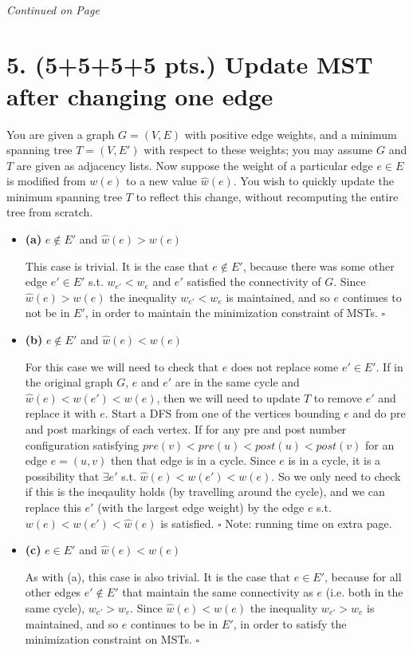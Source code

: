 \documentclass[11pt]{article}
\begin{document}
%
\paragraph{} \emph{Continued on Page \pageref{pg:p4-continuation}}


\newpage

\section*{5. (5+5+5+5 pts.) Update MST after changing one edge}

You are given a graph $G = (V,E)$ with positive edge weights, and a minimum spanning tree $T = (V, E')$ with respect to these weights; you may assume $G$ and $T$ are given as adjacency lists. Now suppose the weight of a particular edge $e \in E$ is modified from $w(e)$ to a new value $\hat{w}(e)$. You wish to quickly update the minimum spanning tree $T$ to reflect this change, without recomputing the entire tree from scratch. 
\begin{itemize}
  \item[] \textbf{(a)} $e \not\in E'$ and $\hat{w}(e) > w(e)$

  This case is trivial. It is the case that $e \not\in E'$, because there was some other edge $e'\in E'$ s.t. $w_{e'}<w_{e}$ and $e'$ satisfied the connectivity of $G$. Since $\hat{w}(e) > w(e)$ the inequality  $w_{e'}<w_{e}$ is maintained, and so $e$ continues to not be in $E'$, in order to maintain the minimization constraint of MSTs. $\square$
  \item[] \textbf{(b)} $e \not\in E'$ and $\hat{w}(e) < w(e)$

  For this case we will need to check that $e$ does not replace some $e'\in E'$. If in the original graph $G$, $e$ and $e'$ are in the same cycle and $\hat{w}(e)<w(e')<w(e)$, then we will need to update $T$ to remove $e'$ and replace it with $e$. Start a DFS from one of the vertices bounding $e$ and do pre and post markings of each vertex. If for any pre and post number configuration satisfying $pre(v)<pre(u)<post(u)<post(v)$ for an edge $e=(u,v)$ then that edge is in a cycle. Since $e$ is in a cycle, it is a possibility that $\exists e'$ s.t. $\hat{w}(e)<w(e')<w(e)$. So we only need to check if this is the ineqaulity holds (by travelling around the cycle), and we can replace this $e'$ (with the largest edge weight) by the edge $e$ s.t. $w(e)<w(e')<\hat{w}(e)$ is satisfied. $\square$ Note: running time on extra page.
  \item[] \textbf{(c)} $e \in E'$ and $\hat{w}(e) < w(e)$

  As with (a), this case is also trivial. It is the case that $e \in E'$, because for all other edges $e'\not\in E'$ that maintain the same connectivity as $e$ (i.e. both in the same cycle), $w_{e'}>w_{e}$. Since $\hat{w}(e) < w(e)$ the inequality  $w_{e'}>w_{e}$ is maintained, and so $e$ continues to be in $E'$, in order to satisfy the minimization constraint on MSTs. $\square$ 

\end{itemize}
\end{document}
